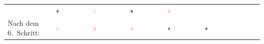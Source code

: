 \begin{tabular}{m{30mm}m{11mm}m{11mm}m{11mm}m{11mm}m{11mm}m{11mm}m{11mm}m{11mm}}
&
\includegraphics[width=0.08\textwidth]{./inf/SEKII/19_Java_Sortierverfahren/HerzKoenig.png}
&
\includegraphics[width=0.08\textwidth]{./inf/SEKII/19_Java_Sortierverfahren/HerzAs.png}
&
\includegraphics[width=0.08\textwidth]{./inf/SEKII/19_Java_Sortierverfahren/HerzDame.png}
&
\includegraphics[width=0.08\textwidth]{./inf/SEKII/19_Java_Sortierverfahren/Herz9.png}
\\
Nach dem 6.\ Schritt: &
\includegraphics[width=0.08\textwidth]{./inf/SEKII/19_Java_Sortierverfahren/Herz7.png}
&
\includegraphics[width=0.08\textwidth]{./inf/SEKII/19_Java_Sortierverfahren/Herz8.png}
&
\includegraphics[width=0.08\textwidth]{./inf/SEKII/19_Java_Sortierverfahren/Herz10.png}
&
\includegraphics[width=0.08\textwidth]{./inf/SEKII/19_Java_Sortierverfahren/HerzBube.png}
&
\includegraphics[width=0.08\textwidth]{./inf/SEKII/19_Java_Sortierverfahren/HerzDame.png}

\end{tabular}
